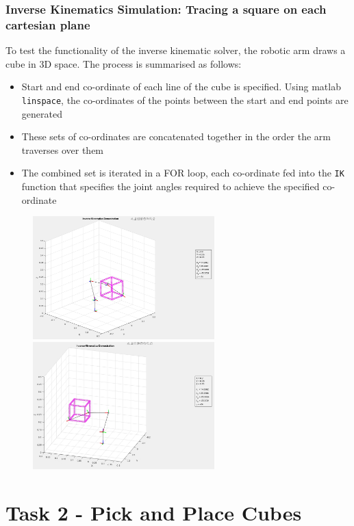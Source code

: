 \documentclass[9pt, a4paper]{article}
\begin{document}
\subsubsection{Inverse Kinematics Simulation: Tracing a square on each cartesian plane}

To test the functionality of the inverse kinematic solver, the robotic arm draws
a cube in 3D space. The process is summarised as follows: 
\begin{itemize}
  \item Start and end co-ordinate of each line of the cube is specified. Using
  matlab \verb+linspace+, the co-ordinates of the points between the
  start and end points are generated 
  \item These sets of co-ordinates are concatenated together in the order the
  arm traverses over them 
  \item The combined set is iterated in a FOR loop, each co-ordinate fed into
  the \verb+IK+ function that specifies the joint angles required to achieve
  the specified co-ordinate
\end{itemize}
\begin{figure}[h]
    \centering
    \includegraphics[width=7cm]{6}
    \hspace{1cm}
    \includegraphics[width=7cm]{7}
\end{figure}

\vfill
\pagebreak

\section{Task 2 - Pick and Place Cubes}
\end{document}
